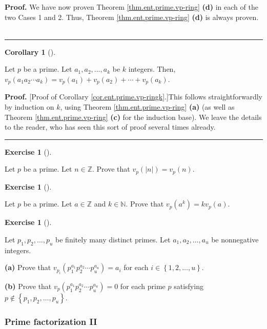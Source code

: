 \documentclass[numbers=enddot,12pt,final,onecolumn,notitlepage]{scrartcl}%
\newcounter{exer}
\numberwithin{exer}{subsection}
\theoremstyle{definition}
\newtheorem{coro}[theo]{Corollary}
\newenvironment{corollary}[1][]
{\begin{coro}[#1]\begin{leftbar}}
{\end{leftbar}\end{coro}}
\newtheorem{exmp}[exer]{Exercise}
\newenvironment{exercise}[1][]
{\begin{exmp}[#1]\begin{leftbar}}
{\end{leftbar}\end{exmp}}
\newenvironment{proof}[1][Proof]{\noindent\textbf{#1.} }{\ \rule{0.5em}{0.5em}}
\begin{document}
\begin{proof}
We have now proven Theorem \ref{thm.ent.prime.vp-ring} \textbf{(d)} in each of
the two Cases 1 and 2. Thus, Theorem \ref{thm.ent.prime.vp-ring} \textbf{(d)}
is always proven.
\end{proof}

\begin{corollary}
\label{cor.ent.prime.vp-ringk}Let $p$ be a prime. Let $a_{1},a_{2}%
,\ldots,a_{k}$ be $k$ integers. Then, $v_{p}\left(  a_{1}a_{2}\cdots
a_{k}\right)  =v_{p}\left(  a_{1}\right)  +v_{p}\left(  a_{2}\right)
+\cdots+v_{p}\left(  a_{k}\right)  $.
\end{corollary}

\begin{proof}
[Proof of Corollary \ref{cor.ent.prime.vp-ringk}.]This follows
straightforwardly by induction on $k$, using Theorem
\ref{thm.ent.prime.vp-ring} \textbf{(a)} (as well as Theorem
\ref{thm.ent.prime.vp-ring} \textbf{(c)} for the induction base). We leave the
details to the reader, who has seen this sort of proof several times already.
\end{proof}

\begin{exercise}
\label{exe.ent.prime.vp-abs}Let $p$ be a prime. Let $n\in\mathbb{Z}$. Prove
that $v_{p}\left(  \left\vert n\right\vert \right)  =v_{p}\left(  n\right)  $.
\end{exercise}

\begin{exercise}
\label{exe.ent.prime.vp-pow}Let $p$ be a prime. Let $a\in\mathbb{Z}$ and
$k\in\mathbb{N}$. Prove that $v_{p}\left(  a^{k}\right)  =kv_{p}\left(
a\right)  $.
\end{exercise}

\begin{exercise}
\label{exe.ent.prime.p1a1puau}Let $p_{1},p_{2},\ldots,p_{u}$ be finitely many
distinct primes. Let $a_{1},a_{2},\ldots,a_{u}$ be nonnegative integers.

\textbf{(a)} Prove that $v_{p_{i}}\left(  p_{1}^{a_{1}}p_{2}^{a_{2}}\cdots
p_{u}^{a_{u}}\right)  =a_{i}$ for each $i\in\left\{  1,2,\ldots,u\right\}  $.

\textbf{(b)} Prove that $v_{p}\left(  p_{1}^{a_{1}}p_{2}^{a_{2}}\cdots
p_{u}^{a_{u}}\right)  =0$ for each prime $p$ satisfying $p\notin\left\{
p_{1},p_{2},\ldots,p_{u}\right\}  $.
\end{exercise}

\subsubsection{Prime factorization II}
\end{document}
